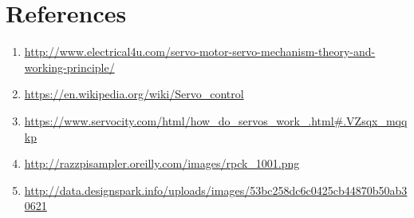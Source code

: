 \documentclass[11pt,a4paper]{article}
\begin{document}
    \newpage 
	\section{References}
		\begin{enumerate}
			\item \url{http://www.electrical4u.com/servo-motor-servo-mechanism-theory-and-working-principle/}
			\item \url{https://en.wikipedia.org/wiki/Servo_control}
			\item \url{https://www.servocity.com/html/how_do_servos_work_.html#.VZsqx_mqqkp}
			\item \url{http://razzpisampler.oreilly.com/images/rpck_1001.png}
			\item  \url{http://data.designspark.info/uploads/images/53bc258dc6c0425cb44870b50ab30621}
		\end{enumerate}
	
\end{document}

